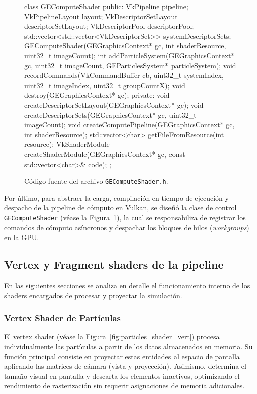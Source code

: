 \begin{figure}[!htbp]
    \centering
\begin{carbonbox}
class GEComputeShader{
public:
    VkPipeline pipeline;
    VkPipelineLayout layout;
    VkDescriptorSetLayout descriptorSetLayout;
    VkDescriptorPool descriptorPool;
    std::vector<std::vector<VkDescriptorSet>> systemDescriptorSets;
    GEComputeShader(GEGraphicsContext* gc, int shaderResource, uint32_t imageCount);
    int addParticleSystem(GEGraphicsContext* gc, uint32_t imageCount, GEParticlesSystem* particleSystem);
    void recordCommands(VkCommandBuffer cb, uint32_t systemIndex, uint32_t imageIndex, uint32_t groupCountX);
    void destroy(GEGraphicsContext* gc);
private:
    void createDescriptorSetLayout(GEGraphicsContext* gc);
    void createDescriptorSets(GEGraphicsContext* gc, uint32_t imageCount);
    void createComputePipeline(GEGraphicsContext* gc, int shaderResource);
    std::vector<char> getFileFromResource(int resource);
    VkShaderModule createShaderModule(GEGraphicsContext* gc, const std::vector<char>& code);
};
\end{carbonbox}
    \caption{Código fuente del archivo \texttt{GEComputeShader.h}.}
    \label{fig:gecomputeshader_code}
\end{figure}

Por último, para abstraer la carga, compilación en tiempo de ejecución y despacho de la pipeline de cómputo en Vulkan, se diseñó la clase de control \texttt{GEComputeShader} (véase la Figura~\ref{fig:gecomputeshader_code}), la cual se responsabiliza de registrar los comandos de cómputo asíncronos y despachar los bloques de hilos (\textit{workgroups}) en la GPU.                                 

\subsection{Vertex y Fragment shaders de la pipeline}

En las siguientes secciones se analiza en detalle el funcionamiento interno de los shaders encargados de procesar y proyectar la simulación.

\subsubsection{Vertex Shader de Partículas}

El vertex shader (véase la Figura~\ref{fig:particles_shader_vert}) procesa individualmente las partículas a partir de los datos almacenados en memoria. Su función principal consiste en proyectar estas entidades al espacio de pantalla aplicando las matrices de cámara (vista y proyección). Asimismo, determina el tamaño visual en pantalla y descarta los elementos inactivos, optimizando el rendimiento de rasterización sin requerir asignaciones de memoria adicionales.


